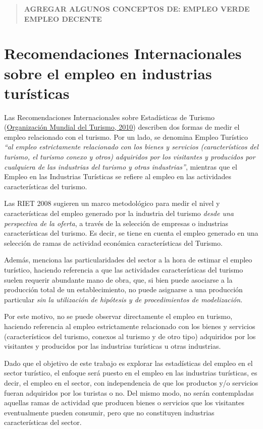 \documentclass[
  openany]{book}
\begin{document}
\begin{quote}
\textbf{AGREGAR ALGUNOS CONCEPTOS DE:}
\textbf{EMPLEO VERDE }
\textbf{EMPLEO DECENTE}
\end{quote}

\hypertarget{recomendaciones-internacionales-sobre-el-empleo-en-industrias-turuxedsticas}{%
\section{Recomendaciones Internacionales sobre el empleo en industrias turísticas}\label{recomendaciones-internacionales-sobre-el-empleo-en-industrias-turuxedsticas}}

Las Recomendaciones Internacionales sobre Estadísticas de Turismo (\protect\hyperlink{ref-riet2008}{Organización Mundial del Turismo, 2010}) describen dos formas de medir el empleo relacionado con el turismo. Por un lado, se denomina Empleo Turístico \emph{``al empleo estrictamente relacionado con los bienes y servicios (característicos del turismo, el turismo conexo y otros) adquiridos por los visitantes y producidos por cualquiera de las industrias del turismo y otras industrias''}, mientras que el Empleo en las Industrias Turísticas se refiere al empleo en las actividades características del turismo.

Las RIET 2008 sugieren un marco metodológico para medir el nivel y características del empleo generado por la industria del turismo \emph{desde una perspectiva de la oferta}, a través de la selección de empresas o industrias características del turismo. Es decir, se tiene en cuenta el empleo generado en una selección de ramas de actividad económica características del Turismo.

Además, menciona las particularidades del sector a la hora de estimar el empleo turístico, haciendo referencia a que las actividades características del turismo suelen requerir abundante mano de obra, que, si bien puede asociarse a la producción total de un establecimiento, no puede asignarse a una producción particular \emph{sin la utilización de hipótesis y de procedimientos de modelización}.

Por este motivo, no se puede observar directamente el empleo en turismo, haciendo referencia al empleo estrictamente relacionado con los bienes y servicios (característicos del turismo, conexos al turismo y de otro tipo) adquiridos por los visitantes y producidos por las industrias turísticas u otras industrias.

Dado que el objetivo de este trabajo es explorar las estadísticas del empleo en el sector turístico, el enfoque será puesto en el empleo en las industrias turísticas, es decir, el empleo en el sector, con independencia de que los productos y/o servicios fueran adquiridos por los turistas o no. Del mismo modo, no serán contempladas aquellas ramas de actividad que producen bienes o servicios que los visitantes eventualmente pueden consumir, pero que no constituyen industrias características del sector.
\end{document}
